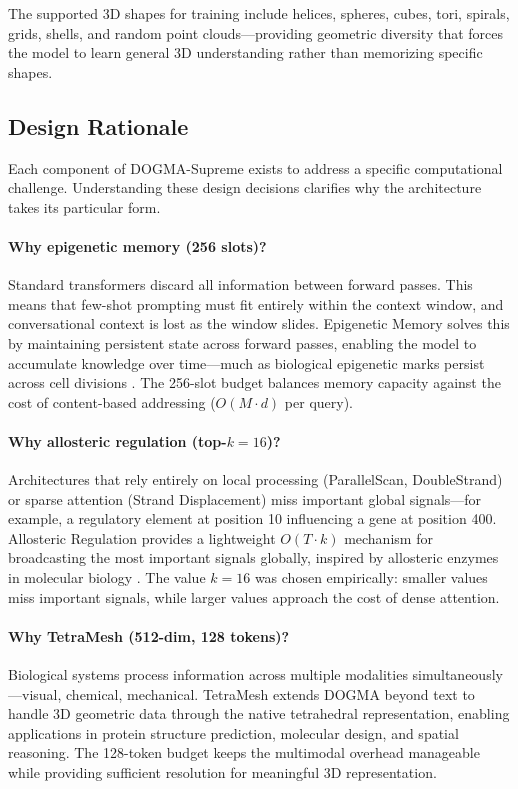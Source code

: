 The supported 3D shapes for training include helices, spheres, cubes, tori, spirals, grids, shells, and random point clouds---providing geometric diversity that forces the model to learn general 3D understanding rather than memorizing specific shapes.

\subsection{Design Rationale}
\label{sec:design-rationale}

Each component of DOGMA-Supreme exists to address a specific computational challenge. Understanding these design decisions clarifies why the architecture takes its particular form.

\paragraph{Why epigenetic memory (256 slots)?} Standard transformers discard all information between forward passes. This means that few-shot prompting must fit entirely within the context window, and conversational context is lost as the window slides. Epigenetic Memory solves this by maintaining persistent state across forward passes, enabling the model to accumulate knowledge over time---much as biological epigenetic marks persist across cell divisions \citep{allis2016}. The 256-slot budget balances memory capacity against the cost of content-based addressing ($O(M \cdot d)$ per query).

\paragraph{Why allosteric regulation (top-$k = 16$)?} Architectures that rely entirely on local processing (ParallelScan, DoubleStrand) or sparse attention (Strand Displacement) miss important global signals---for example, a regulatory element at position 10 influencing a gene at position 400. Allosteric Regulation provides a lightweight $O(T \cdot k)$ mechanism for broadcasting the most important signals globally, inspired by allosteric enzymes in molecular biology \citep{monod1965}. The value $k = 16$ was chosen empirically: smaller values miss important signals, while larger values approach the cost of dense attention.

\paragraph{Why TetraMesh (512-dim, 128 tokens)?} Biological systems process information across multiple modalities simultaneously---visual, chemical, mechanical. TetraMesh extends DOGMA beyond text to handle 3D geometric data through the native tetrahedral representation, enabling applications in protein structure prediction, molecular design, and spatial reasoning. The 128-token budget keeps the multimodal overhead manageable while providing sufficient resolution for meaningful 3D representation.

